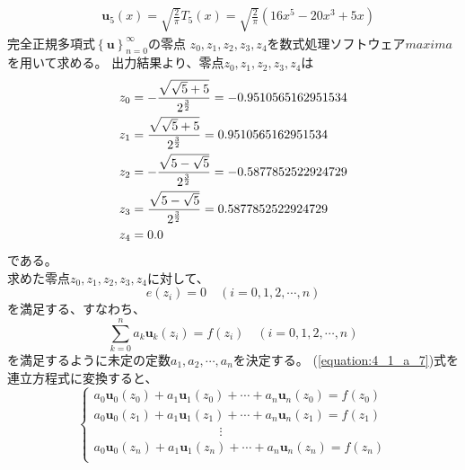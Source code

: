 \begin{enumerate}
\begin{align}
    & \bm{u}_{5} \left(x\right) = \sqrt{\frac{2}{\pi}} T_{5} \left(x\right) = \sqrt{\frac{2}{\pi}} \left(16 x^{5} - 20 x^{3} + 5x\right)
  \end{align}
  完全正規多項式\(\left\{\bm{u}\right\}^{\infty}_{n = 0}\)の零点
  \(z_{0}, z_{1}, z_{2}, z_{3}, z_{4}\)を数式処理ソフトウェア\(maxima\)を用いて求める。
  出力結果より、零点\(z_{0}, z_{1}, z_{2}, z_{3}, z_{4}\)は
  \begin{align}\label{equation:4_1_a_5}
    z_{0} &= -\frac{\sqrt{\sqrt{5}+5}}{{{2}^{\frac{3}{2}}}} = -0.9510565162951534 \notag \\
    z_{1} &=  \frac{\sqrt{\sqrt{5}+5}}{{{2}^{\frac{3}{2}}}} =  0.9510565162951534 \notag \\
    z_{2} &= -\frac{\sqrt{5-\sqrt{5}}}{{{2}^{\frac{3}{2}}}} = -0.5877852522924729 \notag \\
    z_{3} &=  \frac{\sqrt{5-\sqrt{5}}}{{{2}^{\frac{3}{2}}}} =  0.5877852522924729 \notag \\
    z_{4} &=  0.0
  \end{align}
  である。\\
  求めた零点\(z_{0}, z_{1}, z_{2}, z_{3}, z_{4}\)に対して、
  \begin{equation}\label{equation:4_1_a_6}
    e\left(z_{i}\right) = 0 \quad \left(i = 0,1,2,\cdots,n\right)
  \end{equation}
  を満足する、すなわち、
  \begin{equation}\label{equation:4_1_a_7}
    \sum^{n}_{k=0} a_{k} \bm{u}_{k} \left(z_{i}\right) = f\left(z_{i}\right) \quad
    \left(i = 0,1,2,\cdots,n\right)
  \end{equation}
  を満足するように未定の定数\(a_{1}, a_{2}, \cdots, a_{n}\)を決定する。
  (\ref{equation:4_1_a_7})式を連立方程式に変換すると、
  \begin{equation}\label{equation:4_1_a_8}
    \begin{cases}
      a_{0} \bm{u}_{0}(z_{0}) + a_{1} \bm{u}_{1}(z_{0}) + \cdots + a_{n} \bm{u}_{n}(z_{0}) = f(z_{0}) \\
      a_{0} \bm{u}_{0}(z_{1}) + a_{1} \bm{u}_{1}(z_{1}) + \cdots + a_{n} \bm{u}_{n}(z_{1}) = f(z_{1}) \\
      \quad\quad\quad\quad\quad\quad\quad\quad\quad\quad \vdots \\
      a_{0} \bm{u}_{0}(z_{n}) + a_{1} \bm{u}_{1}(z_{n}) + \cdots + a_{n} \bm{u}_{n}(z_{n}) = f(z_{n}) \\
    \end{cases}
  \end{equation}

\end{enumerate}
